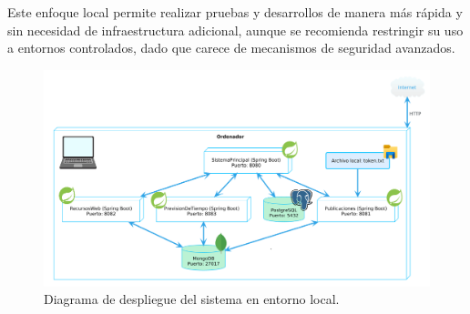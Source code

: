 Este enfoque local permite realizar pruebas y desarrollos de manera más rápida y sin necesidad de infraestructura adicional, aunque se recomienda restringir su uso a entornos controlados, dado que carece de mecanismos de seguridad avanzados.

\begin{figure}[h!tb]
    \centering
    \includegraphics[width=\textwidth]{figs/despliegue_local.png}
    \caption{Diagrama de despliegue del sistema en entorno local.\label{fig:diagrama_despliegue_local}}
\end{figure}
